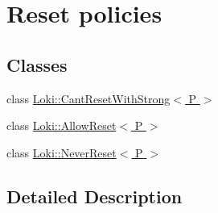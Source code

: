 \hypertarget{group__StrongPointerResetGroup}{}\section{Reset policies}
\label{group__StrongPointerResetGroup}
\subsection*{Classes}
\begin{DoxyCompactItemize}
\item 
class \hyperlink{structLoki_1_1CantResetWithStrong}{Loki\+::\+Cant\+Reset\+With\+Strong$<$ P $>$}
\item 
class \hyperlink{structLoki_1_1AllowReset}{Loki\+::\+Allow\+Reset$<$ P $>$}
\item 
class \hyperlink{structLoki_1_1NeverReset}{Loki\+::\+Never\+Reset$<$ P $>$}
\end{DoxyCompactItemize}


\subsection{Detailed Description}
